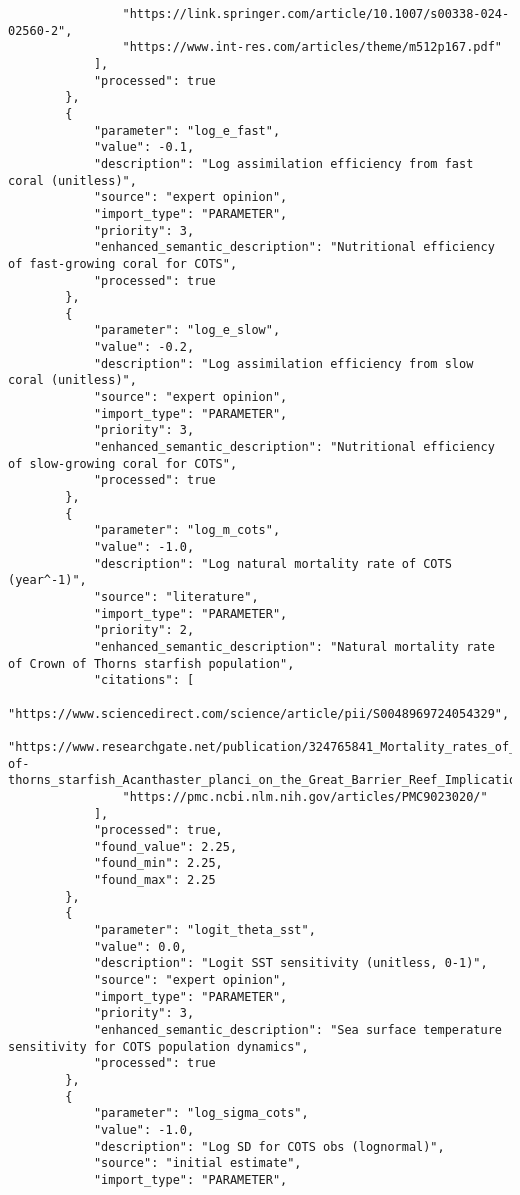 \begin{lstlisting}
                "https://link.springer.com/article/10.1007/s00338-024-02560-2",
                "https://www.int-res.com/articles/theme/m512p167.pdf"
            ],
            "processed": true
        },
        {
            "parameter": "log_e_fast",
            "value": -0.1,
            "description": "Log assimilation efficiency from fast coral (unitless)",
            "source": "expert opinion",
            "import_type": "PARAMETER",
            "priority": 3,
            "enhanced_semantic_description": "Nutritional efficiency of fast-growing coral for COTS",
            "processed": true
        },
        {
            "parameter": "log_e_slow",
            "value": -0.2,
            "description": "Log assimilation efficiency from slow coral (unitless)",
            "source": "expert opinion",
            "import_type": "PARAMETER",
            "priority": 3,
            "enhanced_semantic_description": "Nutritional efficiency of slow-growing coral for COTS",
            "processed": true
        },
        {
            "parameter": "log_m_cots",
            "value": -1.0,
            "description": "Log natural mortality rate of COTS (year^-1)",
            "source": "literature",
            "import_type": "PARAMETER",
            "priority": 2,
            "enhanced_semantic_description": "Natural mortality rate of Crown of Thorns starfish population",
            "citations": [
                "https://www.sciencedirect.com/science/article/pii/S0048969724054329",
                "https://www.researchgate.net/publication/324765841_Mortality_rates_of_small_juvenile_crown-of-thorns_starfish_Acanthaster_planci_on_the_Great_Barrier_Reef_Implications_for_population_size_and_larval_settlement_thresholds_for_outbreaks",
                "https://pmc.ncbi.nlm.nih.gov/articles/PMC9023020/"
            ],
            "processed": true,
            "found_value": 2.25,
            "found_min": 2.25,
            "found_max": 2.25
        },
        {
            "parameter": "logit_theta_sst",
            "value": 0.0,
            "description": "Logit SST sensitivity (unitless, 0-1)",
            "source": "expert opinion",
            "import_type": "PARAMETER",
            "priority": 3,
            "enhanced_semantic_description": "Sea surface temperature sensitivity for COTS population dynamics",
            "processed": true
        },
        {
            "parameter": "log_sigma_cots",
            "value": -1.0,
            "description": "Log SD for COTS obs (lognormal)",
            "source": "initial estimate",
            "import_type": "PARAMETER",

\end{lstlisting}
